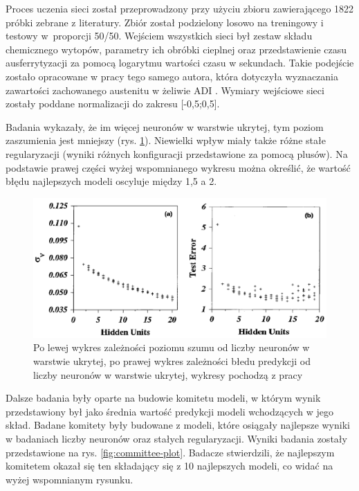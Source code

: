 Proces uczenia sieci został przeprowadzony przy użyciu zbioru zawierającego 1822 próbki zebrane z literatury. Zbiór został podzielony losowo na treningowy i testowy w~proporcji 50/50. Wejściem wszystkich sieci był zestaw składu chemicznego wytopów, parametry ich obróbki cieplnej oraz przedstawienie czasu ausferrytyzacji za pomocą logarytmu wartości czasu w sekundach. Takie podejście zostało opracowane w pracy tego samego autora, która dotyczyła wyznaczania zawartości zachowanego austenitu w żeliwie ADI \cite{YESCAS2001162}. Wymiary wejściowe sieci zostały poddane normalizacji do zakresu [-0,5;0,5].

Badania wykazały, że im więcej neuronów w warstwie ukrytej, tym poziom zaszumienia jest mniejszy (rys. \ref{fig:vhn-pred-mae-plot}). Niewielki wpływ miały także różne stałe regularyzacji (wyniki różnych konfiguracji przedstawione za pomocą plusów). Na podstawie prawej części wyżej wspomnianego wykresu można określić, że wartość błędu najlepszych modeli oscyluje między 1,5 a 2.

\begin{figure}[ht]{}
	\centering
	\includegraphics[scale=0.35]{images/vhn-test-error-plot.png}
	\caption {
		 Po lewej wykres zależności poziomu szumu od liczby neuronów w warstwie ukrytej, po prawej wykres zależności błedu predykcji od liczby neuronów w warstwie ukrytej, wykresy pochodzą z pracy \cite{doi:10.1080/13640461.2003.11819537}
	}
	\label{fig:vhn-pred-mae-plot}
\end{figure}

Dalsze badania były oparte na budowie komitetu modeli, w którym wynik przedstawiony był jako średnia wartość predykcji modeli wchodzących w jego skład. Badane komitety były budowane z modeli, które osiągały najlepsze wyniki w badaniach liczby neuronów oraz stałych regularyzacji. Wyniki badania zostały przedstawione na rys. \ref{fig:committee-plot}. Badacze stwierdzili, że najlepszym komitetem okazał się ten składający się z 10 najlepszych modeli, co widać na wyżej wspomnianym rysunku.

